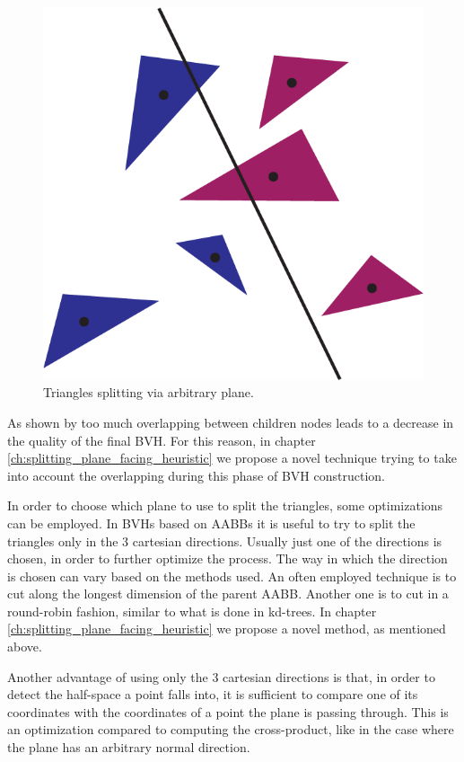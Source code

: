 \documentclass{PoliMi_MasterThesis}
\begin{document}
\begin{figure}[H]
    \centering
    \includegraphics[width=\textwidth*\real{0.4}]{Images/triangle_splitting_arbitrary.png}
    \caption{Triangles splitting via arbitrary plane.}
    \label{fig:triangles_splitting}
\end{figure}

As shown by \cite{bvh_overlapping_metric} too much overlapping between children nodes leads to a decrease in the quality of the final BVH. For this reason, in chapter \ref{ch:splitting_plane_facing_heuristic} we propose a novel technique trying to take into account the overlapping during this phase of BVH construction.

In order to choose which plane to use to split the triangles, some optimizations can be employed. In BVHs based on AABBs it is useful to try to split the triangles only in the 3 cartesian directions. Usually just one of the directions is chosen, in order to further optimize the process. The way in which the direction is chosen can vary based on the methods used. An often employed technique is to cut along the longest dimension of the parent AABB. Another one is to cut in a round-robin fashion, similar to what is done in kd-trees. In chapter \ref{ch:splitting_plane_facing_heuristic} we propose a novel method, as mentioned above.

Another advantage of using only the 3 cartesian directions is that, in order to detect the half-space a point falls into, it is sufficient to compare one of its coordinates with the coordinates of a point the plane is passing through. This is an optimization compared to computing the cross-product, like in the case where the plane has an arbitrary normal direction.
\end{document}
